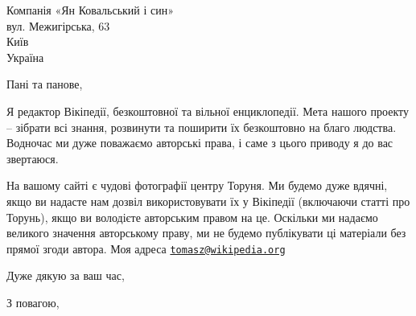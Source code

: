\documentclass[11pt,a4paper]{letter}
\begin{document}
 
\begin{letter}{Компанія «Ян Ковальський і син» \\  вул. Межигірська,
63 \\  Київ \\   Україна } 
\opening{Пані та панове,} 

\indent Я редактор Вікіпедії, безкоштовної та вільної енциклопедії. Мета
нашого проекту -- зібрати всі знання, розвинути та поширити їх
безкоштовно на благо людства. Водночас ми дуже поважаємо авторські
права, і саме з цього приводу я до вас звертаюся.

\indent На вашому сайті є чудові фотографії центру Торуня. Ми будемо
дуже вдячні, якщо ви надасте нам дозвіл використовувати їх у Вікіпедії
(включаючи статті про Торунь), якщо ви володієте авторським правом на
це. Оскільки ми надаємо великого значення авторському праву, ми не
будемо публікувати ці матеріали без прямої згоди автора. Моя адреса
\href{mailto:tomasz@wikipedia.org}{\nolinkurl{tomasz@wikipedia.org}}

\indent Дуже дякую за ваш час,

\closing{З повагою, \\
 \\
}
 
\end{letter} 
\end{document}
